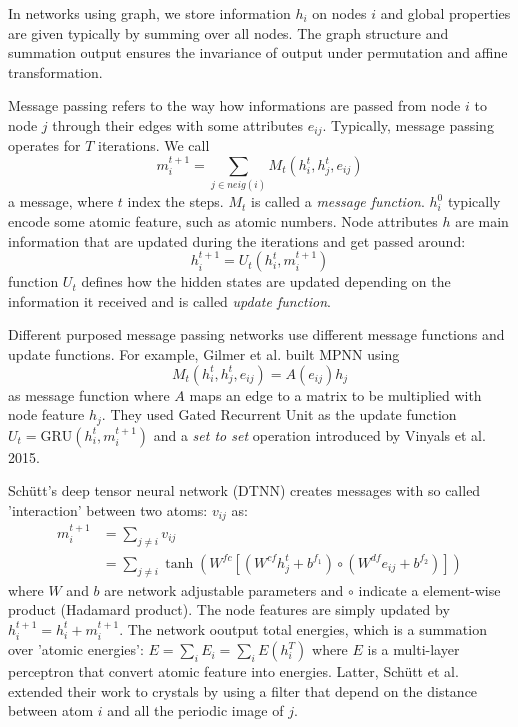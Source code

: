 \documentclass{IEEEtran}
\begin{document}
In networks using graph, we store information $h_i$ on nodes $i$ and global properties are given typically
by summing over all nodes. The graph structure and summation output ensures the invariance of output
under permutation and affine transformation. 

Message passing refers to the way how informations are passed from node $i$ to node $j$ through their 
edges with some attributes $e_{ij}$. Typically, message passing operates for $T$ iterations. We call
\begin{equation}
    m_{i}^{t+1} = \sum_{j\in neig(i)} M_t(h^t_i, h^t_j, e_{ij})
\end{equation}
a message\cite{gilmer_neural_2017}, 
where $t$ index the steps. $M_t$ is called a \emph{message function}. $h^0_i$ typically encode some atomic
feature, such as atomic numbers. 
Node attributes $h$ are main information that are updated during the iterations and get passed around:
\begin{equation}
    h^{t+1}_i = U_t(h_i^t, m_{i}^{t+1})
\end{equation}
function $U_t$ defines how the hidden states are updated depending on the information it received and is called
\emph{update function}. 

Different purposed message passing networks use different message functions and update functions. 
For example, Gilmer et al. built MPNN\cite{gilmer_neural_2017} using 
\begin{equation}
    M_t(h^t_i, h^t_j, e_{ij}) = A(e_{ij}) h_j
\end{equation}
as message function where $A$ maps an edge to a matrix to be multiplied with node feature $h_j$. They used 
Gated Recurrent Unit as the update function $U_t = \text{GRU}(h_i^t, m_i^{t+1})$ and a \emph{set to set} 
operation introduced by Vinyals et al. 2015. 

Sch\"{u}tt's deep tensor neural network (DTNN)\cite{schutt_quantum-chemical_2017} 
creates messages with so called 'interaction' between two 
atoms: $v_{ij}$ as:
\begin{align}
    m_i^{t+1} &= \sum_{j\neq i} v_{ij} \\
            &= \sum_{j\neq i} \tanh \left( W^{fc}[ (W^{cf} h_j^t + b^{f_1}) \circ (W^{df} e_{ij} + b^{f_2}) ] \right)
\end{align}
where $W$ and $b$ are network adjustable parameters and $\circ$ indicate a element-wise product 
(Hadamard product). The node features are simply updated by $h_i^{t+1} = h_i^t + m_i^{t+1}$. 
The network ooutput total energies, which is a summation over 'atomic energies':
$E = \sum_i E_i = \sum_i E(h_i^T)$ where $E$ is a multi-layer perceptron that convert atomic feature 
into energies. Latter, Sch\"{u}tt et al. extended their work to crystals by using a filter that 
depend on the distance between atom $i$ and all the periodic image of $j$\cite{schutt_schnet_2018}. 
\end{document}
